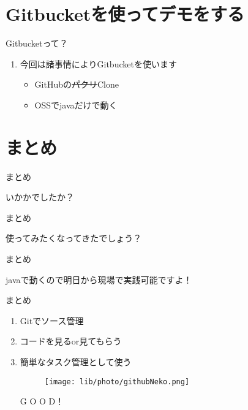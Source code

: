 \documentclass[dvipdfmx]{beamer}
\begin{document}
\section{Gitbucketを使ってデモをする}

\begin{frame}{Gitbucketって？}
\begin{enumerate}
\item 今回は諸事情によりGitbucketを使います
\begin{itemize}
\item GitHubの\sout{パクリ}Clone
\vspace{1cm}
\item OSSでjavaだけで動く
\end{itemize}
\end{enumerate}

\end{frame}

\section{まとめ}
\begin{frame}{まとめ}
\begin{center}
\begin{Huge}
いかかでしたか？
\end{Huge}
\end{center}
\end{frame}

\begin{frame}{まとめ}
\begin{center}
\begin{Huge}
使ってみたくなってきたでしょう？
\end{Huge}
\end{center}
\end{frame}

\begin{frame}{まとめ}
\begin{center}
\begin{Huge}
javaで動くので明日から現場で実践可能ですよ！
\end{Huge}
\end{center}
\end{frame}

\begin{frame}{まとめ}
\begin{enumerate}
\pause
\item \Large{Gitでソース管理}
\pause
\vspace{1cm}
\item \Large{コードを見るor見てもらう}
\pause
\vspace{1cm}
\item \Large{簡単なタスク管理として使う}

\pause
\begin{figure}
\texttt{[image: lib/photo/githubNeko.png]}
\end{figure}
\vspace{-3cm}
\Huge{\color{red}G O O D！}
\end{enumerate}



\end{frame}
\end{document}
